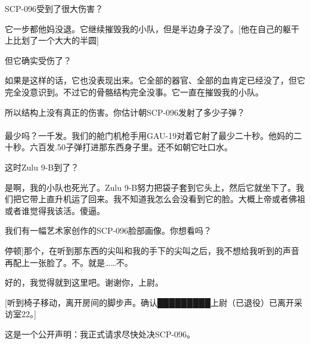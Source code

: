 \begin{scpbox}
SCP-096受到了很大伤害？

它一步都他妈没退。它继续摧毁我的小队，但是半边身子没了。{[}他在自己的躯干上比划了一个大大的半圆]

但它确实受伤了？

如果是这样的话，它也没表现出来。它全部的器官、全部的血肯定已经没了，但它完全没意识到。不过它的骨骼结构完全没事。它一直在摧毁我的小队。

所以结构上没有真正的伤害。你估计朝SCP-096发射了多少子弹？\\
\\
最少吗？一千发。我们的舱门机枪手用GAU-19对着它射了最少二十秒。他妈的二十秒。六百发.50子弹打进那东西身子里。还不如朝它吐口水。

这时Zulu 9-B到了？

是啊，我的小队也死光了。Zulu 9-B努力把袋子套到它头上，然后它就坐下了。我们把它带上直升机运了回来。我不知道我怎么会没看到它的脸。大概上帝或者佛祖或者谁觉得我该活。傻逼。

我们有一幅艺术家创作的SCP-096脸部画像。你想看吗？

\bb{█████████上尉：}{[}停顿]那个，在听到那东西的尖叫和我的手下的尖叫之后，我不想给我听到的声音再配上一张脸了。不。就是……不。

好的，我觉得就到这里吧。谢谢你，上尉。

{[}听到椅子移动，离开房间的脚步声。确认█████████上尉（已退役）已离开采访室22。]

这是一个公开声明：我正式请求尽快处决SCP-096。


\end{scpbox}

\newpage


\newpage

